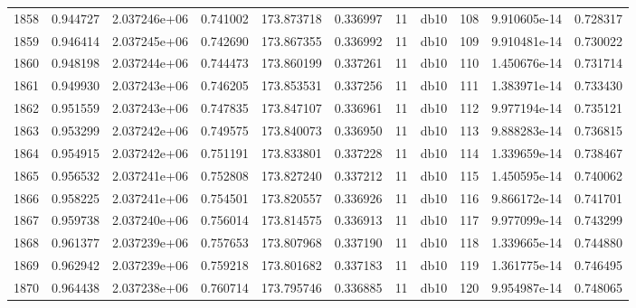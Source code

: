 \begin{tabular}{lrrrrrrlrrr}
1858 &    0.944727 &        2.037246e+06 &  0.741002 &              173.873718 &    0.336997 &      11 &         db10 &    108 &   9.910605e-14 &      0.728317 \\
1859 &    0.946414 &        2.037245e+06 &  0.742690 &              173.867355 &    0.336992 &      11 &         db10 &    109 &   9.910481e-14 &      0.730022 \\
1860 &    0.948198 &        2.037244e+06 &  0.744473 &              173.860199 &    0.337261 &      11 &         db10 &    110 &   1.450676e-14 &      0.731714 \\
1861 &    0.949930 &        2.037243e+06 &  0.746205 &              173.853531 &    0.337256 &      11 &         db10 &    111 &   1.383971e-14 &      0.733430 \\
1862 &    0.951559 &        2.037243e+06 &  0.747835 &              173.847107 &    0.336961 &      11 &         db10 &    112 &   9.977194e-14 &      0.735121 \\
1863 &    0.953299 &        2.037242e+06 &  0.749575 &              173.840073 &    0.336950 &      11 &         db10 &    113 &   9.888283e-14 &      0.736815 \\
1864 &    0.954915 &        2.037242e+06 &  0.751191 &              173.833801 &    0.337228 &      11 &         db10 &    114 &   1.339659e-14 &      0.738467 \\
1865 &    0.956532 &        2.037241e+06 &  0.752808 &              173.827240 &    0.337212 &      11 &         db10 &    115 &   1.450595e-14 &      0.740062 \\
1866 &    0.958225 &        2.037241e+06 &  0.754501 &              173.820557 &    0.336926 &      11 &         db10 &    116 &   9.866172e-14 &      0.741701 \\
1867 &    0.959738 &        2.037240e+06 &  0.756014 &              173.814575 &    0.336913 &      11 &         db10 &    117 &   9.977099e-14 &      0.743299 \\
1868 &    0.961377 &        2.037239e+06 &  0.757653 &              173.807968 &    0.337190 &      11 &         db10 &    118 &   1.339665e-14 &      0.744880 \\
1869 &    0.962942 &        2.037239e+06 &  0.759218 &              173.801682 &    0.337183 &      11 &         db10 &    119 &   1.361775e-14 &      0.746495 \\
1870 &    0.964438 &        2.037238e+06 &  0.760714 &              173.795746 &    0.336885 &      11 &         db10 &    120 &   9.954987e-14 &      0.748065 \\

\end{tabular}

